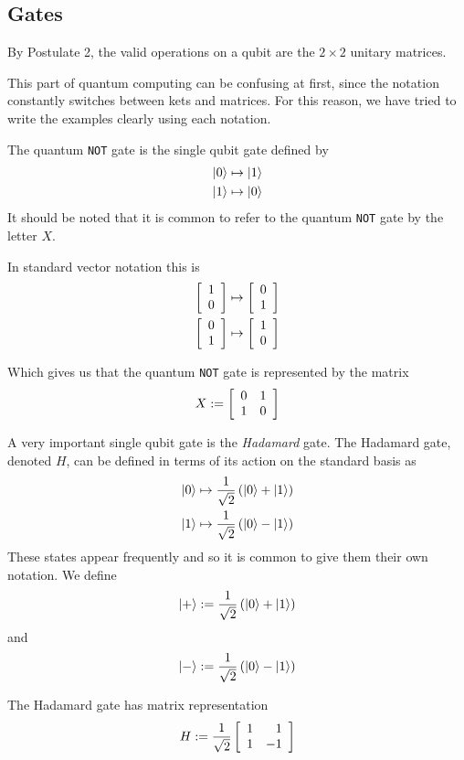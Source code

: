     
    
    
\subsection{Gates}
        
        By Postulate 2, the valid operations on a qubit are the $2 \times 2$ unitary matrices.

        This part of quantum computing can be confusing at first, since the notation constantly switches between 
        kets and matrices. For this reason, we have tried to write the examples clearly using each notation.

        \begin{example}
            The quantum \texttt{NOT} gate is the single qubit gate defined by
            \begin{align*}
                \ket{0} &\mapsto \ket{1} \\
                \ket{1} &\mapsto \ket{0}
            \end{align*}
            It should be noted that it is common to refer to the quantum \texttt{NOT} gate by the letter $X$.

            In standard vector notation this is
            \begin{align*}
                \left[\begin{array}{r}1\\0\end{array}\right] &\mapsto \left[\begin{array}{r}0\\1\end{array}\right] \\
                \left[\begin{array}{r}0\\1\end{array}\right] &\mapsto \left[\begin{array}{r}1\\0\end{array}\right] 
            \end{align*}

            Which gives us that the quantum \texttt{NOT} gate is represented by the matrix
            \[
                X := \left[\begin{array}{rr}0&1\\1&0\end{array}\right]
            \]
        \end{example}

        
        \begin{example}
            A very important single qubit gate is the \emph{Hadamard} gate. The Hadamard gate, denoted $H$, can be 
            defined in terms of its action on the standard basis as
            \begin{align*}
                \ket{0} &\mapsto \frac{1}{\sqrt{2}}\left(\ket{0} + \ket{1}\right) \\
                \ket{1} &\mapsto \frac{1}{\sqrt{2}}\left(\ket{0} - \ket{1}\right)
            \end{align*}
            These states appear frequently and so it is common to give them their own notation.
            We define
            \[
                \ket{+} := \frac{1}{\sqrt{2}}\left(\ket{0} + \ket{1}\right)
            \]
            and
            \[
                \ket{-} := \frac{1}{\sqrt{2}}\left(\ket{0} - \ket{1}\right)
            \]

            The Hadamard gate has matrix representation
            \[
                H := \frac{1}{\sqrt{2}} \left[\begin{array}{rr}1&1\\1&-1\end{array}\right]
            \]
        \end{example}

